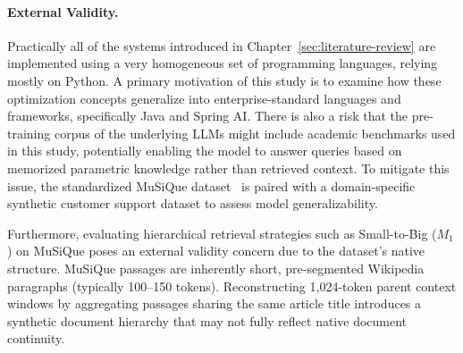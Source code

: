 \paragraph{External Validity.}
Practically all of the systems introduced in Chapter~\ref{sec:literature-review} are implemented using a very homogeneous set of programming languages, relying mostly on Python. A primary motivation of this study is to examine how these optimization concepts generalize into enterprise-standard languages and frameworks, specifically Java and Spring AI. There is also a risk that the pre-training corpus of the underlying LLMs might include academic benchmarks used in this study, potentially enabling the model to answer queries based on memorized parametric knowledge rather than retrieved context. To mitigate this issue, the standardized MuSiQue dataset~\citep{trivedi2022musique} is paired with a domain-specific synthetic customer support dataset to assess model generalizability.

Furthermore, evaluating hierarchical retrieval strategies such as Small-to-Big ($M_1$) on MuSiQue poses an external validity concern due to the dataset's native structure. MuSiQue passages are inherently short, pre-segmented Wikipedia paragraphs (typically 100--150 tokens). Reconstructing 1,024-token parent context windows by aggregating passages sharing the same article title introduces a synthetic document hierarchy that may not fully reflect native document continuity.
